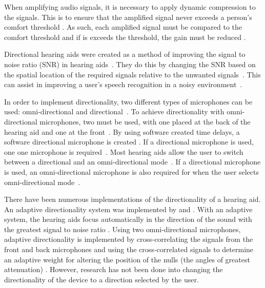\documentclass[10pt,twocolumn]{witseiepaper}
\begin{document}
When amplifying audio signals, it is necessary to apply dynamic compression to the signals. This is to ensure that the amplified signal never exceeds a person's comfort threshold \cite{Complexity_effective_auditory_compensation, Loudness_compensation_method_based_on_human_auditory}. As such, each amplified signal must be compared to the comfort threshold and if is exceeds the threshold, the gain must be reduced \cite{Complexity_effective_auditory_compensation}.

Directional hearing aids were created as a method of improving the signal to noise ratio (SNR) in hearing aids~\cite{trends_in_amplification}. They do this by changing the SNR based on the spatial location of the required signals relative to the unwanted signals~\cite{trends_in_amplification}. This can assist in improving a user's speech recognition in a noisy environment~\cite{trends_in_amplification}. 
 
In order to implement directionality, two different types of microphones can be used: omni-directional and directional~\cite{An_ultra_low_power_analogue_directionality, trends_in_amplification}. To achieve directionality with omni-directional microphones, two must be used, with one placed at the back of the hearing aid and one at the front~\cite{An_ultra_low_power_analogue_directionality, trends_in_amplification}. By using software created time delays, a software directional microphone is created \cite{Distortion_of_interaural_time_cues}. If a directional microphone is used, one one microphone is required~\cite{trends_in_amplification}. Most hearing aids allow the user to switch between a directional and an omni-directional mode~\cite{trends_in_amplification}. If a directional microphone is used, an omni-directional microphone is also required for when the user selects omni-directional mode~\cite{trends_in_amplification}.

There have been numerous implementations of the directionality of a hearing aid. An adaptive directionality system was implemented by \cite{An_ultra_low_power_analogue_directionality} and \cite{Evaluation_of_digital_hearing_aid_algorithms}. With an adaptive system, the hearing aids focus automatically in the direction of the sound with the greatest signal to noise ratio \cite{An_ultra_low_power_analogue_directionality}. Using two omni-directional microphones, adaptive directionality is implemented by cross-correlating the signals from the front and back microphones and using the cross-correlated signals to determine an adaptive weight for altering the position of the nulls (the angles of greatest attenuation) \cite{An_ultra_low_power_analogue_directionality}. However, research has not been done into changing the directionality of the device to a direction selected by the user.
\end{document}
